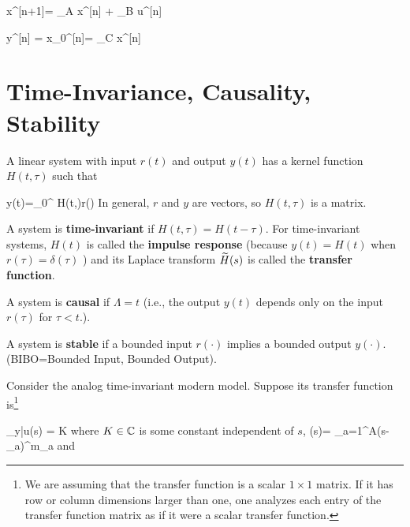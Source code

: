 \beq
x^{[n+1]}=
_{A}
x^{[n]}
+ \underbrace{\left[
\begin{array}{c}
0
\\
0
\\
1
\end{array}
\right]}_{B}
u^{[n]}
\eeq

\beq
y^{[n]} = x_0^{[n]}=
_{C}
x^{[n]}
\eeq



\section{Time-Invariance, Causality, Stability}

A linear system with input $r(t)$
and output $y(t)$
has  a kernel function $H(t, \tau)$
such that

\beq
y(t)=\int_0^{\Lambda} H(t,\tau)r(\tau)
\eeq
In general,
$r$ and $y$
are vectors, so
$H(t,\tau)$
is a matrix.

A system
is  {\bf time-invariant}
if $H(t,\tau)=H(t-\tau)$. For time-invariant
systems, $H(t)$
is called the 
{\bf impulse response}
(because $y(t)=H(t)$
when $r(\tau)=\delta(\tau)$ )
and its Laplace transform
${\widetilde{H}}(s)$
is called the {\bf transfer function}.

A system  is {\bf causal}
if $\Lambda=t$ (i.e.,  the output $y(t)$ depends only on 
the input $r(\tau)$
for $\tau<t$.).

A system is {\bf stable}
if a bounded input $r(\cdot)$  implies
a bounded output $y(\cdot)$.
(BIBO=Bounded Input, Bounded Output).



Consider the analog time-invariant modern model.
Suppose its transfer function is\footnote{We 
are assuming that the transfer 
function is a scalar $1\times 1$ matrix. If
it has
row or column dimensions  larger than one,
one analyzes
each entry
of the transfer function matrix as if it were
a scalar transfer function.}

\beq
{}_{y|u}(s)
= K
\eeq
where $K\in { \mathbb{C}}$ is some
constant independent of $s$, 
\beq
\caln(s)= \prod_{a=1}^{A}(s-\alpha_a)^{m_a}
\eeq
and

